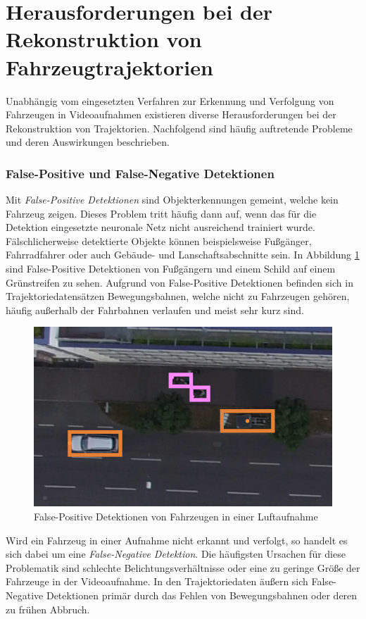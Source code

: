 \section{Herausforderungen bei der Rekonstruktion von Fahrzeugtrajektorien}
\label{sec:grund_challenges_reconstruction}

Unabhängig vom eingesetzten Verfahren zur Erkennung und Verfolgung von Fahrzeugen in Videoaufnahmen
existieren diverse Herausforderungen bei der Rekonstruktion von Trajektorien. Nachfolgend sind
häufig auftretende Probleme und deren Auswirkungen beschrieben.

\subsubsection*{False-Positive und False-Negative Detektionen}
Mit \textit{False-Positive Detektionen} sind Objekterkennungen gemeint, welche kein Fahrzeug zeigen.
Dieses Problem tritt häufig dann auf, wenn das für die Detektion eingesetzte neuronale Netz nicht ausreichend trainiert wurde.
Fälschlicherweise detektierte Objekte können beispielsweise Fußgänger, Fahrradfahrer oder auch Gebäude- und Lanschaftsabschnitte sein.
In Abbildung \ref{fig:grund_false_positive_detections} sind False-Positive Detektionen von Fußgängern
und einem Schild auf einem Grünstreifen zu sehen.
Aufgrund von False-Positive Detektionen befinden sich in Trajektoriedatensätzen Bewegungsbahnen, welche nicht zu
Fahrzeugen gehören, häufig außerhalb der Fahrbahnen verlaufen und meist sehr kurz sind.

\begin{figure}[H]
    \centering
    \includegraphics[width=0.45\linewidth]{resources/img/grundlagen/TrajectoryReconstruction/challenges/False-Positives}
    \caption[False-Positive Detektionen]{False-Positive Detektionen von Fahrzeugen in einer Luftaufnahme}
    \label{fig:grund_false_positive_detections}
\end{figure}

Wird ein Fahrzeug in einer Aufnahme nicht erkannt und verfolgt, so handelt es sich dabei um eine
\textit{False-Negative Detektion}.
Die häufigsten Ursachen für diese Problematik sind schlechte Belichtungsverhältnisse oder eine zu geringe
Größe der Fahrzeuge in der Videoaufnahme.
In den Trajektoriedaten äußern sich False-Negative Detektionen primär durch das Fehlen von Bewegungsbahnen
oder deren zu frühen Abbruch.

